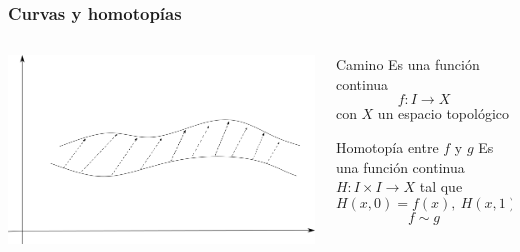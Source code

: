 \documentclass[xetex,mathserif,serif]{beamer}
\begin{document}
  \begin{frame}
    \frametitle{Curvas y homotopías}
    \begin{columns}

      \begin{column}{.5\textwidth}
        \begin{center}
          \includegraphics[scale=0.3]{../tesis/imagenes/homotopia.png}
        \end{center}
      \end{column}

      \begin{column}{.5\textwidth}
        \begin{block}{Camino}
          Es una función continua \[ f : I \to X \] con \(X\) un espacio
          topológico
        \end{block}

        \begin{block}{Homotopía entre \(f\) y \(g\)}
          Es una función continua \(H : I \times I \to X\) tal que
          \[ H(x,0) = f(x),\ H(x,1) = g(x) \]
          \[ f \sim g \]
        \end{block}
      \end{column}
    \end{columns}
  \end{frame}
\end{document}
